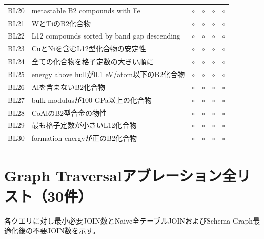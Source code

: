 \documentclass[3p]{elsarticle}
\begin{document}
\begin{longtable}{lp{5.5cm}cccc}
  BL20 & metastable B2 compounds with Fe & $\circ$ & $\circ$ & $\circ$ & $\circ$ \\
  BL21 & WとTiのB2化合物 & $\circ$ & $\circ$ & $\circ$ & $\circ$ \\
  BL22 & L12 compounds sorted by band gap descending & $\circ$ & $\circ$ & $\circ$ & $\circ$ \\
  BL23 & CuとNiを含むL12型化合物の安定性 & $\circ$ & $\circ$ & $\circ$ & $\circ$ \\
  BL24 & 全ての化合物を格子定数の大きい順に & $\circ$ & $\circ$ & $\circ$ & $\circ$ \\
  BL25 & energy above hullが0.1 eV/atom以下のB2化合物 & $\circ$ & $\circ$ & $\circ$ & $\circ$ \\
  BL26 & Alを含まないB2化合物 & $\circ$ & $\circ$ & $\circ$ & $\circ$ \\
  BL27 & bulk modulusが100 GPa以上の化合物 & $\circ$ & $\circ$ & $\circ$ & $\circ$ \\
  BL28 & CoAlのB2型合金の物性 & $\circ$ & $\circ$ & $\circ$ & $\circ$ \\
  BL29 & 最も格子定数が小さいL12化合物 & $\circ$ & $\circ$ & $\circ$ & $\circ$ \\
  BL30 & formation energyが正のB2化合物 & $\circ$ & $\circ$ & $\circ$ & $\circ$ \\
\end{longtable}
\newpage

\section{Graph Traversalアブレーション全リスト（30件）}
\label{sup:traversal}

各クエリに対し最小必要JOIN数とNaive全テーブルJOINおよびSchema Graph最適化後の不要JOIN数を示す。
\end{document}
